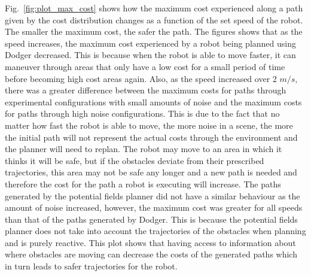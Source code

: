 Fig.~\ref{fig:plot_max_cost} shows how the maximum cost experienced along a
path given by the cost distribution changes as a function of the set speed of
the robot. The smaller the maximum cost, the safer the path. The figures shows
that as the speed increases, the maximum cost experienced by a robot being
planned using Dodger decreased. This is because when the robot is able to move
faster, it can maneuver through areas that only have a low cost for a small
period of time before becoming high cost areas again. Also, as the speed
increased over 2 $m/s$, there was a greater difference between the maximum
costs for paths through experimental configurations with small amounts of noise
and the maximum costs for paths through high noise configurations.  This is due
to the fact that no matter how fast the robot is able to move, the more noise
in a scene, the more the initial path will not represent the actual costs
through the environment and the planner will need to replan. The robot may move
to an area in which it thinks it will be safe, but if the obstacles deviate
from their prescribed trajectories, this area may not be safe any longer and a
new path is needed and therefore the cost for the path a robot is executing
will increase.  The paths generated by the potential fields planner did not
have a similar behaviour as the amount of noise increased, however, the maximum
cost was greater for all speeds than that of the paths generated by Dodger.
This is because the potential fields planner does not take into account the
trajectories of the obstacles when planning and is purely reactive. This plot
shows that having access to information about where obstacles are moving can
decrease the costs of the generated paths which in turn leads to safer
trajectories for the robot.

